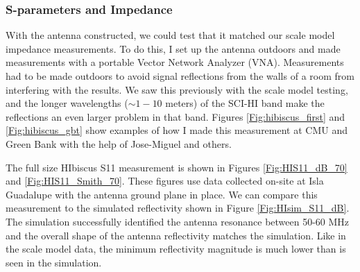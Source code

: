 \subsubsection{S-parameters and Impedance}\label{Sec:HIbiscus_Imp}

With the antenna constructed, we could test that it matched our scale model impedance measurements. To do this, I set up the antenna outdoors and made measurements with a portable Vector Network Analyzer (VNA). Measurements had to be made outdoors to avoid signal reflections from the walls of a room from interfering with the results. We saw this previously with the scale model testing, and the longer wavelengths ($\sim 1-10$ meters) of the SCI-HI band make the reflections an even larger problem in that band. Figures \ref{Fig:hibiscus_first} and \ref{Fig:hibiscus_gbt} show examples of how I made this measurement at CMU and Green Bank with the help of Jose-Miguel and others.

The full size HIbiscus S11 measurement is shown in Figures \ref{Fig:HIS11_dB_70} and \ref{Fig:HIS11_Smith_70}. These figures use data collected on-site at Isla Guadalupe with the antenna ground plane in place. We can compare this measurement to the simulated reflectivity shown in Figure \ref{Fig:HIsim_S11_dB}. The simulation successfully identified the antenna resonance between 50-60 MHz and the overall shape of the antenna reflectivity matches the simulation. Like in the scale model data, the minimum reflectivity magnitude is much lower than is seen in the simulation. 

